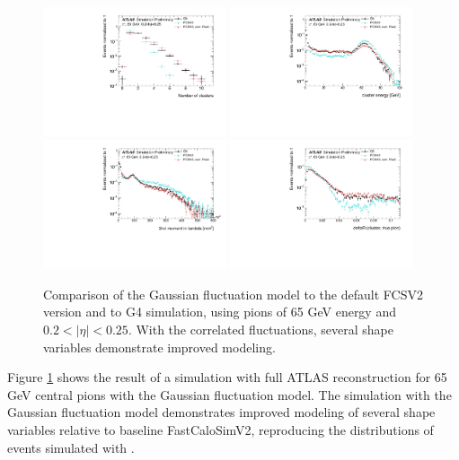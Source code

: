 \begin{figure}[ht!]
\centering
\includegraphics[width=0.48\textwidth]{figures/FCS-fig-07.pdf}
\includegraphics[width=0.48\textwidth]{figures/FCS-fig-08.pdf}
\includegraphics[width=0.48\textwidth]{figures/FCS-fig-10.pdf}
\includegraphics[width=0.48\textwidth]{figures/FCS-fig-11.pdf}
\caption{Comparison of the Gaussian fluctuation model to the default FCSV2 version and to G4 simulation, using pions of 65 GeV energy and $0.2 < |\eta| < 0.25$. With the correlated fluctuations, several shape variables demonstrate improved modeling.}
\label{fig-6} 
\end{figure}


Figure \ref{fig-6} shows the result of a simulation with full ATLAS reconstruction for 65 GeV central pions with the Gaussian fluctuation model. The simulation with the Gaussian fluctuation model demonstrates improved modeling of several shape variables relative to baseline FastCaloSimV2, reproducing the distributions of events simulated with \GEANT.

